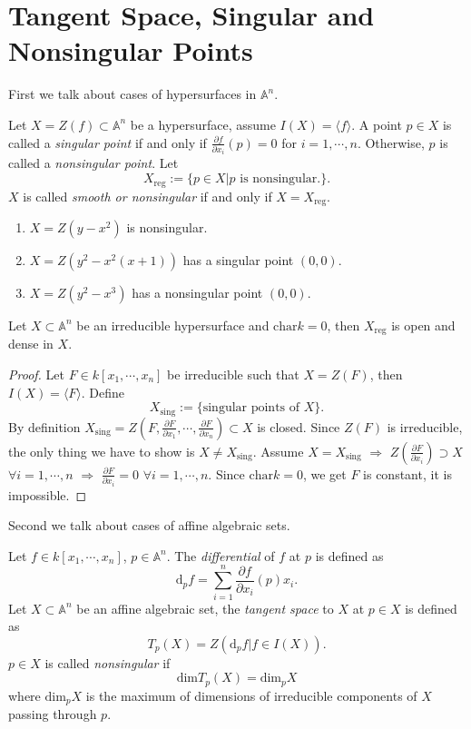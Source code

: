 \section{Tangent Space, Singular and Nonsingular Points}
First we talk about cases of hypersurfaces in $ \mathbb{A}^n $.
\begin{definition}
	Let $ X=Z(f)\subset \mathbb{A}^n $ be a hypersurface, assume $ I(X)=\langle f \rangle $. A point $ p\in X $ is called a \textit{singular point} if and only if $ \frac{\partial f}{\partial x_i}(p)=0 $ for $ i=1,\cdots,n $. Otherwise, $ p $ is called a \textit{nonsingular point}. Let
	$$
		X_{\mathrm{reg}}:=\lbrace p\in X|p\text{ is nonsingular}. \rbrace.
	$$
	$ X $ is called \textit{smooth or nonsingular} if and only if $ X=X_{\mathrm{reg}} $.
\end{definition}
\begin{example}
	\begin{enumerate}
		\item $ X=Z(y-x^2) $ is nonsingular.
		\item $ X=Z(y^2-x^2(x+1)) $ has a singular point $ (0,0) $.
		\item $ X=Z(y^2-x^3) $ has a nonsingular point $ (0,0) $.
	\end{enumerate}
\end{example}
\begin{proposition}
	Let $ X\subset \mathbb{A}^n $ be an irreducible hypersurface and $ \text{char}k=0 $, then $ X_{\mathrm{reg}} $ is open and dense in $ X $.
\end{proposition}
\begin{proof}
	Let $ F\in k[x_1,\cdots,x_n] $ be irreducible such that $ X=Z(F) $, then $ I(X)=\langle F \rangle $. Define
	$$
		X_{\mathrm{sing}}:=\lbrace \text{singular points of } X \rbrace.
	$$
	By definition $ X_{\mathrm{sing}}= Z(F,\frac{\partial F}{\partial x_1},\cdots,\frac{\partial F}{\partial x_n}) \subset X$ is closed. Since $ Z(F) $ is irreducible, the only thing we have to show is $ X\neq X_{\mathrm{sing}} $. Assume $ X=X_{\mathrm{sing}} $ $ \Rightarrow $ $ Z(\frac{\partial F}{\partial x_i})\supset X $ $ \forall i=1,\cdots,n $ $ \Rightarrow $ $ \frac{\partial F}{\partial x_i}=0 $ $ \forall i=1,\cdots,n $. Since $ \text{char}k=0 $, we get $ F $ is constant, it is impossible.
\end{proof}
Second we talk about cases of affine algebraic sets.
\begin{definition}
	Let $ f\in k[x_1,\cdots,x_n] $, $ p\in\mathbb{A}^n $. The \textit{differential} of $ f $ at $ p $ is defined as
	$$
		\text{d}_p f=\sum\limits_{i=1}^{n}\frac{\partial f}{\partial x_i}(p)x_i.
	$$
	Let $ X\subset \mathbb{A}^n $ be an affine algebraic set, the \textit{tangent space} to $ X $ at $ p\in X $ is defined as
	$$
		T_p(X)=Z(\mathrm{d}_p f| f\in I(X)).
	$$
	$ p\in X $ is called  \textit{nonsingular} if
	$$
		\mathrm{dim}T_p(X)= \mathrm{dim}_pX
	$$
	where $ \mathrm{dim}_pX $ is the maximum of dimensions of irreducible components of $ X $ passing through $ p $.
\end{definition}
